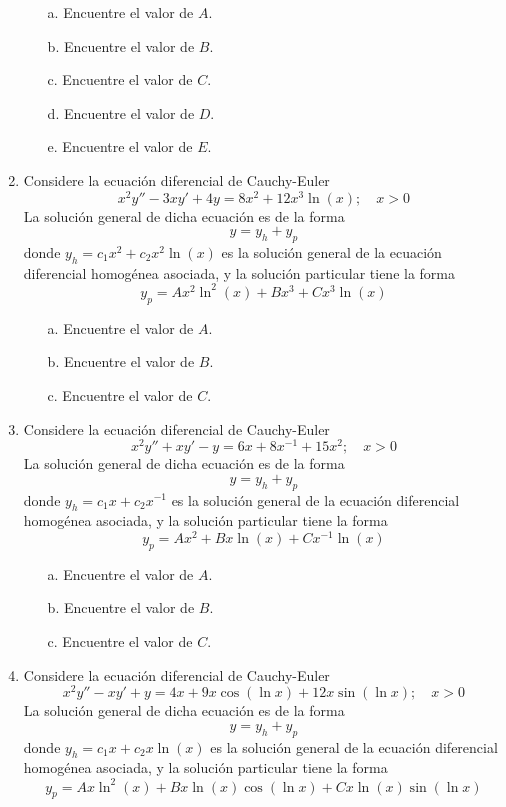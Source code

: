 \begin{enumerate}
\begin{itemize}
    \item[a.] Encuentre el valor de $A$.
    \item[b.] Encuentre el valor de $B$.
    \item[c.] Encuentre el valor de $C$.
    \item[d.] Encuentre el valor de $D$.
    \item[e.] Encuentre el valor de $E$.
\end{itemize}

\item Considere la ecuación diferencial de Cauchy-Euler
$$x^2y'' - 3xy' + 4y = 8x^2 + 12x^3\ln(x); \quad x > 0$$
La solución general de dicha ecuación es de la forma
$$y = y_h + y_p$$
donde $y_h = c_1x^2 + c_2x^2\ln(x)$ es la solución general de la ecuación diferencial homogénea asociada, y la solución particular tiene la forma
$$y_p = Ax^2\ln^2(x) + Bx^3 + Cx^3\ln(x)$$

\begin{itemize}
    \item[a.] Encuentre el valor de $A$.
    \item[b.] Encuentre el valor de $B$.
    \item[c.] Encuentre el valor de $C$.
\end{itemize}

\item Considere la ecuación diferencial de Cauchy-Euler
$$x^2y'' + xy' - y = 6x + 8x^{-1} + 15x^2; \quad x > 0$$
La solución general de dicha ecuación es de la forma
$$y = y_h + y_p$$
donde $y_h = c_1x + c_2x^{-1}$ es la solución general de la ecuación diferencial homogénea asociada, y la solución particular tiene la forma
$$y_p = Ax^2 + Bx\ln(x) + Cx^{-1}\ln(x)$$

\begin{itemize}
    \item[a.] Encuentre el valor de $A$.
    \item[b.] Encuentre el valor de $B$.
    \item[c.] Encuentre el valor de $C$.
\end{itemize}

\item Considere la ecuación diferencial de Cauchy-Euler
$$x^2y'' - xy' + y = 4x + 9x\cos(\ln x) + 12x\sin(\ln x); \quad x > 0$$
La solución general de dicha ecuación es de la forma
$$y = y_h + y_p$$
donde $y_h = c_1x + c_2x\ln(x)$ es la solución general de la ecuación diferencial homogénea asociada, y la solución particular tiene la forma
$$y_p = Ax\ln^2(x) + Bx\ln(x)\cos(\ln x) + Cx\ln(x)\sin(\ln x)$$


\end{enumerate}
